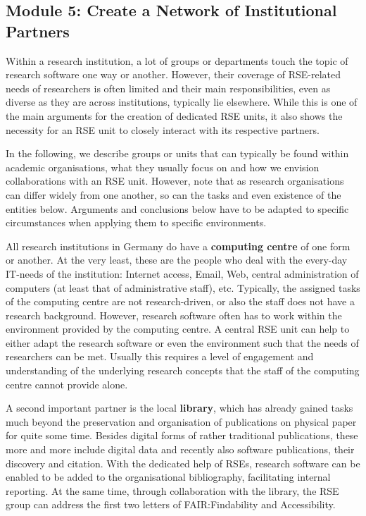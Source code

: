 \documentclass[a4paper]{article}
\begin{document}
\subsection{Module 5: Create a Network of Institutional Partners}%
\label{sec:partners}

Within a research institution, a lot of groups or departments touch the topic of research software one way or another.
However, their coverage of RSE-related needs of researchers is often limited and their main responsibilities, even as diverse as they are across institutions, typically lie elsewhere.
While this is one of the main arguments for the creation of dedicated RSE units, it also shows the necessity for an RSE unit to closely interact with its respective partners.

In the following, we describe groups or units that can typically be found within academic organisations,
what they usually focus on and how we envision collaborations with an RSE unit.
However, note that as research organisations can differ widely from one another, so can the tasks and even existence of the entities below.
Arguments and conclusions below have to be adapted to specific circumstances when applying them to specific environments.

All research institutions in Germany do have a \textbf{computing centre} of one form or another.
At the very least, these are the people who deal with the every-day IT-needs of the institution:
Internet access, Email, Web, central administration of computers (at least that of administrative staff), etc.
Typically, the assigned tasks of the computing centre are not research-driven, or also the staff does not have a research background.
However, research software often has to work within the environment provided by the computing centre.
A central RSE unit can help to either adapt the research software or even the environment such that the needs of researchers can be met.
Usually this requires a level of engagement and understanding of the underlying research concepts that the staff of the computing centre cannot provide alone.

A second important partner is the local \textbf{library}, which has already gained tasks much beyond the preservation and organisation of publications on physical paper for quite some time.
Besides digital forms of rather traditional publications, these more and more include digital data and recently also software publications, their discovery and citation.
With the dedicated help of RSEs, research software can be enabled to be added to the organisational bibliography, facilitating internal reporting.
At the same time, through collaboration with the library, the RSE group can address the first two letters of FAIR:\@ Findability and Accessibility.
\end{document}
